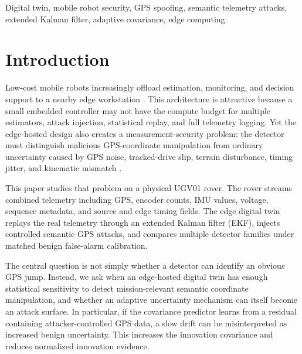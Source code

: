\documentclass[conference]{IEEEtran}
\begin{document}
\begin{IEEEkeywords}
Digital twin, mobile robot security, GPS spoofing, semantic telemetry attacks,
extended Kalman filter, adaptive covariance, edge computing.
\end{IEEEkeywords}

\section{Introduction}

Low-cost mobile robots increasingly offload estimation, monitoring, and
decision support to a nearby edge workstation \cite{ref48,ref61}. This architecture is attractive
because a small embedded controller may not have the compute budget for
multiple estimators, attack injection, statistical replay, and full telemetry
logging. Yet the edge-hosted design also creates a measurement-security
problem: the detector must distinguish malicious GPS-coordinate manipulation
from ordinary uncertainty caused by GPS noise, tracked-drive slip, terrain
disturbance, timing jitter, and kinematic mismatch \cite{ref11,ref43,ref65}.

This paper studies that problem on a physical UGV01 rover. The rover streams
combined telemetry including GPS, encoder counts, IMU values, voltage,
sequence metadata, and source and edge timing fields. The edge digital twin
replays the real telemetry through an extended Kalman filter (EKF), injects
controlled semantic GPS attacks, and compares multiple detector families under
matched benign false-alarm calibration.

The central question is not simply whether a detector can identify an obvious
GPS jump. Instead, we ask when an edge-hosted digital twin has enough
statistical sensitivity to detect mission-relevant semantic coordinate
manipulation, and whether an adaptive uncertainty mechanism can itself become
an attack surface. In particular, if the covariance predictor learns from a
residual containing attacker-controlled GPS data, a slow drift can be
misinterpreted as increased benign uncertainty. This increases the innovation
covariance and reduces normalized innovation evidence.
\end{document}
